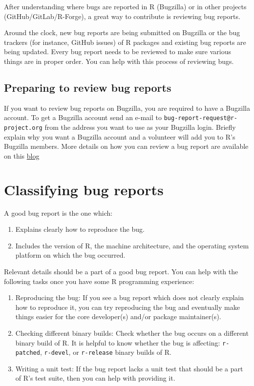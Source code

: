 \documentclass[
]{book}
\begin{document}
After understanding where bugs are reported in R (Bugzilla) or in other projects (GitHub/GitLab/R-Forge), a great way to contribute is reviewing bug reports.

Around the clock, new bug reports are being submitted on Bugzilla or the bug trackers (for instance, GitHub issues) of R packages and existing bug reports are being updated. Every bug report needs to be reviewed to make sure various things are in proper order. You can help with this process of reviewing bugs.

\hypertarget{preparing-to-review-bug-reports}{%
\subsection{Preparing to review bug reports}\label{preparing-to-review-bug-reports}}

If you want to review bug reports on Bugzilla, you are required to have a Bugzilla account. To get a Bugzilla account send an e-mail to \texttt{bug-report-request@r-project.org} from the address you want to use as your Bugzilla login. Briefly explain why you want a Bugzilla account and a volunteer will add you to R's Bugzilla members. More details on how you can review a bug report are available on this \href{https://developer.r-project.org/Blog/public/2019/10/09/r-can-use-your-help-reviewing-bug-reports/}{blog}

\hypertarget{classifying-bug-reports}{%
\section{Classifying bug reports}\label{classifying-bug-reports}}

A good bug report is the one which:

\begin{enumerate}
\def\labelenumi{\arabic{enumi}.}
\item
  Explains clearly how to reproduce the bug.
\item
  Includes the version of R, the machine architecture, and the operating system platform on which the bug occurred.
\end{enumerate}

Relevant details should be a part of a good bug report. You can help with the following tasks once you have some R programming experience:

\begin{enumerate}
\def\labelenumi{\arabic{enumi}.}
\item
  Reproducing the bug: If you see a bug report which does not clearly explain how to reproduce it, you can try reproducing the bug and eventually make things easier for the core developer(s) and/or package maintainer(s).
\item
  Checking different binary builds: Check whether the bug occurs on a different binary build of R. It is helpful to know whether the bug is affecting: \texttt{r-patched}, \texttt{r-devel}, or \texttt{r-release} binary builds of R.
\item
  Writing a unit test: If the bug report lacks a unit test that should be a part of R's test suite, then you can help with providing it.
\end{enumerate}
\end{document}
